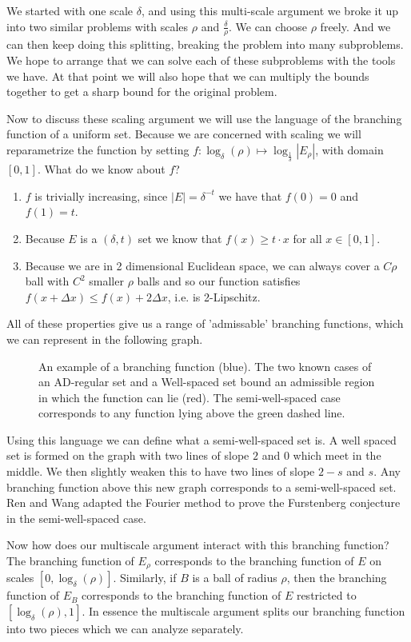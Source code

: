 \documentclass[12pt]{amsart}
\begin{document}
We started with one scale $\delta$, and using this multi-scale argument we broke it up into two similar problems with scales $\rho$ and $\frac{\delta}{\rho}$.   We can choose $\rho$ freely.   And we can then keep doing this splitting, breaking the problem into many subproblems.   We hope to arrange that we can solve each of these subproblems with the tools we have.   At that point we will also hope that we can multiply the bounds together to get a sharp bound for the original problem.  

Now to discuss these scaling argument we will use the language of the branching function of a uniform set. Because we are concerned with scaling we will reparametrize the function by setting $f : \log_\delta (\rho) \mapsto \log_{\frac{1}{\delta}} |E_\rho|$, with domain $[0,1]$. What do we know about $f$?
\begin{enumerate}
  \item $f$ is trivially increasing, since $|E| = \delta^{-t}$ we have that $f(0) = 0$ and $f(1) = t$.
  \item Because $E$ is a $(\delta,t)$ set we know that $f(x) \geq t \cdot x$ for all $x \in [0,1]$.
  \item Because we are in 2 dimensional Euclidean space, we can always cover a $C \rho$ ball with $C^2$ smaller $\rho$ balls and so our function satisfies $f(x + \Delta x) \leq f(x) + 2 \Delta x$, i.e. is 2-Lipschitz.
\end{enumerate}
All of these properties give us a range of 'admissable' branching functions, which we can represent in the following graph.
\begin{figure}[h]
  \centering
  
  \caption{An example of a branching function (blue). The two known cases of an AD-regular set and a Well-spaced set bound an admissible region in which the function can lie (red). The semi-well-spaced case corresponds to any function lying above the green dashed line.}
\end{figure}

Using this language we can define what a semi-well-spaced set is. A well spaced set is formed on the graph with two lines of slope $2$ and $0$ which meet in the middle. We then slightly weaken this to have two lines of slope $2 - s$ and $s$. Any branching function above this new graph corresponds to a semi-well-spaced set.  Ren and Wang adapted the Fourier method to prove the Furstenberg conjecture in the semi-well-spaced case.

Now how does our multiscale argument interact with this branching function? The branching function of $E_\rho$ corresponds to the branching function of $E$ on scales $[0,  \log_\delta (\rho)]$.    Similarly,  if $B$ is a ball of radius $\rho$,  then the branching function of $E_B$ corresponds to the branching function of $E$ restricted to $[\log_\delta (\rho), 1]$.   
In essence the multiscale argument splits our branching function into two pieces which we can analyze separately.
\end{document}
